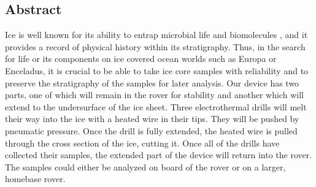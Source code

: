 \documentclass{article}
\begin{document}
\subsection{Abstract}
Ice is well known for its ability to entrap microbial life and biomolecules \cite{Knowlton}, and it provides a record of physical history within its stratigraphy. Thus, in the search for life or its components on ice covered ocean worlds such as Europa or Enceladus, it is crucial to be able to take ice core samples with reliability and to preserve the stratigraphy of the samples for later analysis. Our device has two parts, one of which will remain in the rover for stability and another which will extend to the undersurface of the ice sheet. Three electrothermal drills will melt their way into the ice with a heated wire in their tips. They will be pushed by pneumatic pressure. Once the drill is fully extended, the heated wire is pulled through the cross section of the ice, cutting it. Once all of the drills have collected their samples, the extended part of the device will return into the rover. The samples could either be analyzed on board of the rover or on a larger, homebase rover.
\end{document}
